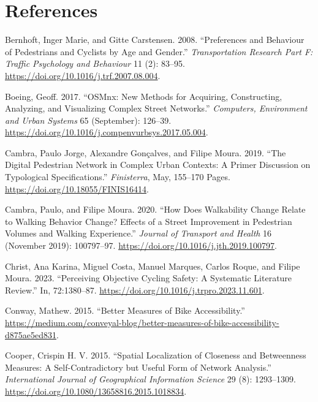 \documentclass[
  sn-nature,
]{sn-jnl}
\newlength{\cslhangindent}
\newenvironment{CSLReferences}[2] %
 {\begin{list}{}{%
  \setlength{\itemindent}{0pt}
  \setlength{\leftmargin}{0pt}
  \setlength{\parsep}{0pt}
  \ifodd #1
   \setlength{\leftmargin}{\cslhangindent}
   \setlength{\itemindent}{-1\cslhangindent}
  \fi
  \setlength{\itemsep}{#2\baselineskip}}}
 {\end{list}}
\begin{document}
\section{References}\label{references}

\label{refs}
\begin{CSLReferences}{1}{0}
Bernhoft, Inger Marie, and Gitte Carstensen. 2008. {``Preferences and
Behaviour of Pedestrians and Cyclists by Age and Gender.''}
\emph{Transportation Research Part F: Traffic Psychology and Behaviour}
11 (2): 83--95. \url{https://doi.org/10.1016/j.trf.2007.08.004}.

Boeing, Geoff. 2017. {``OSMnx: New Methods for Acquiring, Constructing,
Analyzing, and Visualizing Complex Street Networks.''} \emph{Computers,
Environment and Urban Systems} 65 (September): 126--39.
\url{https://doi.org/10.1016/j.compenvurbsys.2017.05.004}.

Cambra, Paulo Jorge, Alexandre Gonçalves, and Filipe Moura. 2019. {``The
Digital Pedestrian Network in Complex Urban Contexts: A Primer
Discussion on Typological Specifications.''} \emph{Finisterra}, May,
155--170 Pages. \url{https://doi.org/10.18055/FINIS16414}.

Cambra, Paulo, and Filipe Moura. 2020. {``How Does Walkability Change
Relate to Walking Behavior Change? Effects of a Street Improvement in
Pedestrian Volumes and Walking Experience.''} \emph{Journal of Transport
and Health} 16 (November 2019): 100797--97.
\url{https://doi.org/10.1016/j.jth.2019.100797}.

Christ, Ana Karina, Miguel Costa, Manuel Marques, Carlos Roque, and
Filipe Moura. 2023. {``Perceiving Objective Cycling Safety: A Systematic
Literature Review.''} In, 72:1380--87.
\url{https://doi.org/10.1016/j.trpro.2023.11.601}.

Conway, Mathew. 2015. {``Better Measures of Bike Accessibility.''}
\url{https://medium.com/conveyal-blog/better-measures-of-bike-accessibility-d875ae5ed831}.

Cooper, Crispin H. V. 2015. {``Spatial Localization of Closeness and
Betweenness Measures: A Self-Contradictory but Useful Form of Network
Analysis.''} \emph{International Journal of Geographical Information
Science} 29 (8): 1293--1309.
\url{https://doi.org/10.1080/13658816.2015.1018834}.


\end{CSLReferences}
\end{document}
